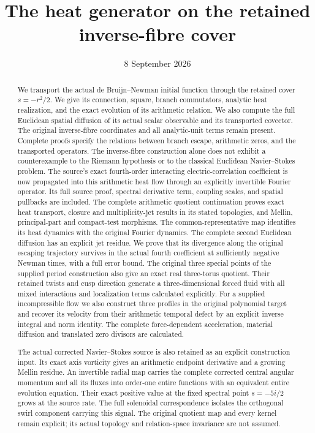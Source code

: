 \documentclass[11pt,a4paper]{article}
\title{The heat generator on the retained inverse-fibre cover}
\author{}
\date{8 September 2026}
\theoremstyle{definition}
\theoremstyle{plain}
\begin{document}
\maketitle
\begin{abstract}
We transport the actual de Bruijn--Newman initial function through the
retained cover $s=-r^2/2$. We give its connection, square, branch
commutators, analytic heat realization, and the exact evolution of its
arithmetic relation. We also compute the full Euclidean spatial
diffusion of its actual scalar observable and its transported covector.
The original inverse-fibre coordinates and all
analytic-unit terms remain present. Complete proofs specify the
relations between branch escape, arithmetic zeros, and the transported
operators. The inverse-fibre construction alone does not exhibit a counterexample
to the Riemann hypothesis or to the classical Euclidean Navier--Stokes problem.
The source's exact fourth-order interacting electric-correlation
coefficient is now propagated into this arithmetic heat flow through
an explicitly invertible Fourier operator. Its full source proof,
spectral derivative term, coupling scales, and spatial pullbacks are
included. The complete arithmetic quotient continuation proves exact
heat transport, closure and multiplicity-jet results in its stated
topologies, and Mellin, principal-part and compact-test morphisms.
The common-representative map identifies its heat dynamics with
the original Fourier dynamics.
The complete second Euclidean diffusion has an explicit jet residue.
We prove that its divergence along the original escaping trajectory
survives in the actual fourth coefficient at sufficiently negative
Newman times, with a full error bound.
The original three special points of the supplied period construction
also give an exact real three-torus quotient. Their retained twists and
cusp direction generate a three-dimensional forced fluid with all mixed
interactions and localization terms calculated explicitly.
For a supplied incompressible flow we also construct three profiles in
the original polynomial target and recover its velocity from their
arithmetic temporal defect by an explicit inverse integral and norm
identity. The complete force-dependent acceleration, material diffusion
and translated zero divisors are calculated.

The actual corrected Navier--Stokes source is also retained as an
explicit construction input. Its exact axis vorticity gives an arithmetic
endpoint derivative and a growing Mellin residue. An invertible radial
map carries the complete corrected central angular momentum and all its
fluxes into order-one entire functions with an equivalent entire
evolution equation. Their exact positive value at the fixed spectral
point \(s=-5i/2\) grows at the source rate. The full solenoidal
correspondence isolates the orthogonal swirl component carrying this
signal. The original quotient map and every kernel remain explicit;
its actual topology and relation-space invariance are not assumed.
\end{abstract}
\end{document}
